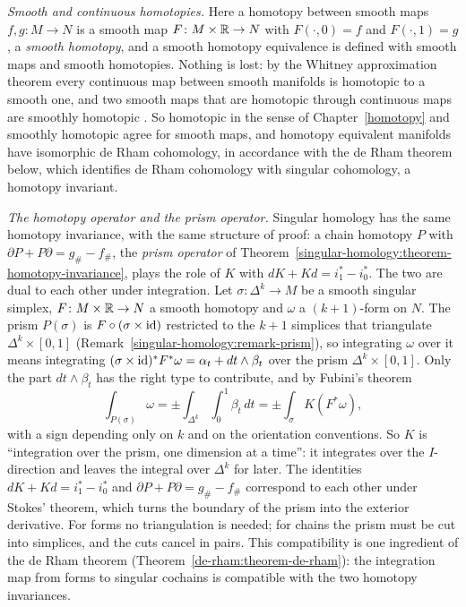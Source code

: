 \begin{remark}\label{de-rham:remark-smooth-homotopy}
\emph{Smooth and continuous homotopies.} Here a homotopy between smooth maps $f, g \colon M \to N$ is a smooth map $F \colon M \times \mathbb{R} \to N$ with $F(\cdot, 0) = f$ and $F(\cdot, 1) = g$, a \emph{smooth
homotopy}, and a smooth homotopy equivalence is defined with smooth maps and smooth homotopies. Nothing is lost: by the Whitney approximation theorem every continuous map between smooth manifolds is
homotopic to a smooth one, and two smooth maps that are homotopic through continuous maps are smoothly homotopic \cite[Chapter 6]{lee-smooth-manifolds}. So homotopic in the sense of
Chapter~\ref{homotopy} and smoothly homotopic agree for smooth maps, and homotopy equivalent manifolds have isomorphic de Rham cohomology, in accordance with the de Rham theorem below, which identifies
de Rham cohomology with singular cohomology, a homotopy invariant.
\end{remark}

\begin{remark}\label{de-rham:remark-k-and-prism}
\emph{The homotopy operator and the prism operator.} Singular homology has the same homotopy invariance, with the same structure of proof: a chain homotopy $P$ with $\partial P + P\partial = g_\# - f_\#$, the
\emph{prism operator} of Theorem~\ref{singular-homology:theorem-homotopy-invariance}, plays the role of $K$ with $dK + Kd = i_1^* - i_0^*$. The two are dual to each other under integration. Let $\sigma \colon \Delta^k \to M$ be a
smooth singular simplex, $F \colon M \times \mathbb{R} \to N$ a smooth homotopy and $\omega$ a $(k+1)$-form on $N$. The prism $P(\sigma)$ is $F \circ (\sigma \times \mathrm{id})$ restricted to the $k + 1$ simplices that triangulate
$\Delta^k \times [0, 1]$ (Remark~\ref{singular-homology:remark-prism}), so integrating $\omega$ over it means integrating $(\sigma \times \mathrm{id})^*F^*\omega = \alpha_t + dt \wedge \beta_t$ over the prism
$\Delta^k \times [0, 1]$. Only the part $dt \wedge \beta_t$ has the right type to contribute, and by Fubini's theorem
\[
\int_{P(\sigma)}\omega = \pm\int_{\Delta^k}\int_0^1\beta_t\,dt = \pm\int_\sigma K(F^*\omega),
\]
with a sign depending only on $k$ and on the orientation conventions. So $K$ is ``integration over the prism, one dimension at a time'': it integrates over the $I$-direction and leaves the integral over
$\Delta^k$ for later. The identities $dK + Kd = i_1^* - i_0^*$ and $\partial P + P\partial = g_\# - f_\#$ correspond to each other under Stokes' theorem, which turns the boundary of the prism into the exterior derivative.
For forms no triangulation is needed; for chains the prism must be cut into simplices, and the cuts cancel in pairs. This compatibility is one ingredient of the de Rham theorem
(Theorem~\ref{de-rham:theorem-de-rham}): the integration map from forms to singular cochains is compatible with the two homotopy invariances.
\end{remark}

